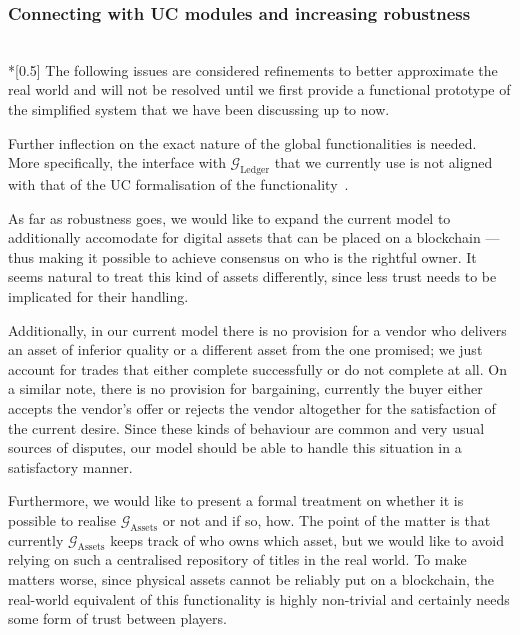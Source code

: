 \subsubsection{Connecting with UC modules and increasing robustness} \ \\*[0.5\baselineskip]
  The following issues are considered refinements to better approximate the real world and
  will not be resolved until we first provide a functional prototype of the simplified
  system that we have been discussing up to now.

  Further inflection on the exact nature of the global functionalities is needed. More
  specifically, the interface with $\mathcal{G}_{\mathrm{Ledger}}$ that we currently use
  is not aligned with that of the UC formalisation of the functionality~\cite{ucledger}.

  As far as robustness goes, we would like to expand the current model to additionally
  accomodate for digital assets that can be placed on a blockchain --- thus making it
  possible to achieve consensus on who is the rightful owner. It seems natural to treat
  this kind of assets differently, since less trust needs to be implicated for their
  handling.

  Additionally, in our current model there is no provision for a vendor who delivers an
  asset of inferior quality or a different asset from the one promised; we just account
  for trades that either complete successfully or do not complete at all. On a similar
  note, there is no provision for bargaining, currently the buyer either accepts the
  vendor's offer or rejects the vendor altogether for the satisfaction of the current
  desire. Since these kinds of behaviour are common and very usual sources of disputes,
  our model should be able to handle this situation in a satisfactory manner.

  Furthermore, we would like to present a formal treatment on whether it is possible to
  realise $\mathcal{G}_{\mathrm{Assets}}$ or not and if so, how. The point of the matter
  is that currently $\mathcal{G}_{\mathrm{Assets}}$ keeps track of who owns which asset,
  but we would like to avoid relying on such a centralised repository of titles in the
  real world. To make matters worse, since physical assets cannot be reliably put on a
  blockchain, the real-world equivalent of this functionality is highly non-trivial and
  certainly needs some form of trust between players.
